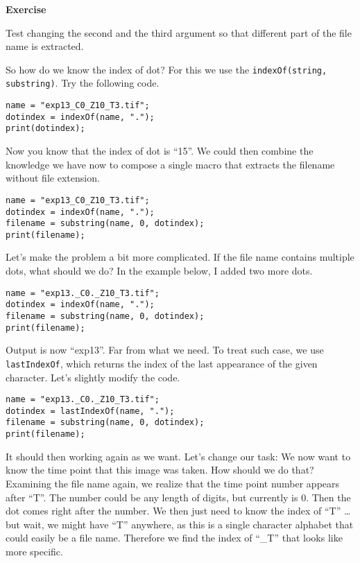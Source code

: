 \documentclass[11pt,a4paper,oneside]{report}
\newenvironment{indentexercise}[1]%
{{\setlength{\leftmargin}{2em}}%
\textbf{Exercise \thesubsection-#1}%
\begin{list}{}%
	\item%
}
{\end{list}}
\newcommand{\ilcom}[1]{\texttt{\small#1}}
\begin{document}
\begin{indentexercise}{1}
Test changing the second and the third argument so that different part of the file name is extracted. 
\end{indentexercise}

So how do we know the index of dot? For this we use the \ilcom{indexOf(string, substring)}. Try the following code. 

\begin{lstlisting}
name = "exp13_C0_Z10_T3.tif";
dotindex = indexOf(name, ".");
print(dotindex);
\end{lstlisting}

Now you know that the index of dot is ``15''. We could then combine the knowledge we have now to compose a single macro that extracts the filename without file extension. 

\begin{lstlisting}
name = "exp13_C0_Z10_T3.tif";
dotindex = indexOf(name, ".");
filename = substring(name, 0, dotindex);
print(filename);
\end{lstlisting}

Let's make the problem a bit more complicated. If the file name contains multiple dots, what should we do? In the example below, I added two more dots. 

\begin{lstlisting}
name = "exp13._C0._Z10_T3.tif";
dotindex = indexOf(name, ".");
filename = substring(name, 0, dotindex);
print(filename);
\end{lstlisting}

Output is now ``exp13''. Far from what we need. To treat such case, we use \ilcom{lastIndexOf}, which returns the index of the last appearance of the given character. Let's slightly modify the code. 

\begin{lstlisting}
name = "exp13._C0._Z10_T3.tif";
dotindex = lastIndexOf(name, ".");
filename = substring(name, 0, dotindex);
print(filename);
\end{lstlisting}

It should then working again as we want. Let's change our task: We now want to know the time point that this image was taken. How should we do that? Examining the file name again, we realize that the time point number appears after ``T''. The number could be any length of digits, but currently is 0. Then the dot comes right after the number. We then just need to know the index of ``T'' \ldots but wait, we might have ``T'' anywhere, as this is a single character alphabet that could easily be a file name. Therefore we find the index of ``\_T'' that looks like more specific. 
\end{document}
